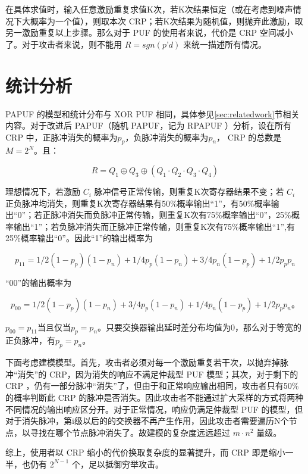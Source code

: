 在具体求值时，输入任意激励重复求值K次，若K次结果恒定（或在考虑到噪声情况下大概率为一个值），则取本次 CRP；若K次结果为随机值，则抛弃此激励，取另一激励重复以上步骤。那么对于 PUF 的使用者来说，代价是 CRP 空间减小了。对于攻击者来说，则不能用 $ R=sgn(p’d) $ 来统一描述所有情况。


\section{统计分析}\label{sec:rpa_stat}
PAPUF 的模型和统计分布与 XOR PUF 相同，具体参见\ref{sec:relatedwork}节相关内容。对于改进后 PAPUF（随机 PAPUF，记为 RPAPUF ）分析，设在所有 CRP 中，正脉冲消失的概率为$ p_p $，负脉冲消失的概率为$ p_n $， CRP 的总数是 $ M=2^N $。且：

\begin{equation}
R=Q_1\oplus Q_3\oplus (Q_1\cdot Q_2\cdot Q_3\cdot Q_4)
\end{equation}

理想情况下，若激励 $ C_i $ 脉冲信号正常传输，则重复K次寄存器结果不变；若 $ C_i $ 正负脉冲均消失，则重复K次寄存器结果有50\%概率输出``1''，有50\%概率输出``0''；若正脉冲消失而负脉冲正常传输，则重复K次有75\%概率输出``0''，25\%概率输出``1''；若负脉冲消失而正脉冲正常传输，则重复K次有75\%概率输出``1'',有25\%概率输出``0''。因此``1''的输出概率为

\begin{equation}
p_11=1/2 (1-p_p )(1-p_n )+1/4 p_p (1-p_n )+3/4 p_n (1-p_p )+1/2 p_p p_n
\end{equation}

``00''的输出概率为

\begin{equation}
p_00=1/2 (1-p_p )(1-p_n )+3/4 p_p (1-p_n )+1/4 p_n (1-p_p )+1/2 p_p p_n。
\end{equation}

$ p_{00}=p_{11} $当且仅当$ p_p=p_n $。只要交换器输出延时差分布均值为0，那么对于等宽的正负脉冲，有$ p_p=p_n $。

下面考虑建模模型。首先，攻击者必须对每一个激励重复若干次，以抛弃掉脉冲``消失''的 CRP，因为消失的响应不满足仲裁型 PUF 模型；其次，对于剩下的 CRP ，仍有一部分脉冲``消失''了，但由于和正常响应输出相同，攻击者只有50\%的概率判断此 CRP 的脉冲是否消失。因此攻击者不能通过扩大采样的方式将两种不同情况的输出响应区分开。对于正常情况，响应仍满足仲裁型 PUF 的模型，但对于消失脉冲，第i级以后的的交换器不再产生作用，因此攻击者需要遍历N个节点，以寻找在哪个节点脉冲消失了。故建模的复杂度远远超过 $ m\cdot n^2 $ 量级。

综上，使用者以 CRP 缩小的代价换取复杂度的显著提升，而 CRP 即是缩小一半，也仍有 $ 2^{N-1} $ 个，足以抵御穷举攻击。


